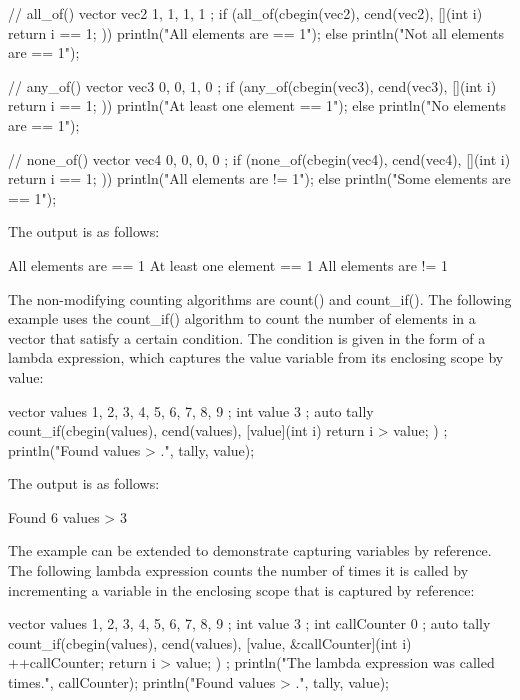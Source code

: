 \begin{cpp}
// all_of()
vector vec2 { 1, 1, 1, 1 };
if (all_of(cbegin(vec2), cend(vec2), [](int i){ return i == 1; })) {
    println("All elements are == 1");
} else {
    println("Not all elements are == 1");
}

// any_of()
vector vec3 { 0, 0, 1, 0 };
if (any_of(cbegin(vec3), cend(vec3), [](int i){ return i == 1; })) {
    println("At least one element == 1");
} else {
    println("No elements are == 1");
}

// none_of()
vector vec4 { 0, 0, 0, 0 };
if (none_of(cbegin(vec4), cend(vec4), [](int i){ return i == 1; })) {
    println("All elements are != 1");
} else {
    println("Some elements are == 1");
}
\end{cpp}

The output is as follows:

\begin{shell}
All elements are == 1
At least one element == 1
All elements are != 1
\end{shell}


The non-modifying counting algorithms are count() and count\_if(). The following example uses the count\_if() algorithm to count the number of elements in a vector that satisfy a certain condition. The condition is given in the form of a lambda expression, which captures the value variable from its enclosing scope by value:

\begin{cpp}
vector values { 1, 2, 3, 4, 5, 6, 7, 8, 9 };
int value { 3 };
auto tally { count_if(cbegin(values), cend(values),
    [value](int i){ return i > value; }) };
println("Found {} values > {}.", tally, value);
\end{cpp}

The output is as follows:

\begin{shell}
Found 6 values > 3
\end{shell}

The example can be extended to demonstrate capturing variables by reference. The following lambda expression counts the number of times it is called by incrementing a variable in the enclosing scope that is captured by reference:

\begin{cpp}
vector values { 1, 2, 3, 4, 5, 6, 7, 8, 9 };
int value { 3 };
int callCounter { 0 };
auto tally { count_if(cbegin(values), cend(values),
    [value, &callCounter](int i){ ++callCounter; return i > value; }) };
println("The lambda expression was called {} times.", callCounter);
println("Found {} values > {}.", tally, value);
\end{cpp}

